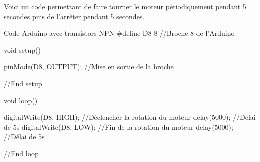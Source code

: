     Voici un code permettant de faire tourner le moteur périodiquement pendant 5 secondes puis de l'arrêter pendant 5 secondes.

\begin{Cpp}{Code Arduino avec transistors NPN}
#define D8 8     //Broche 8 de l'Arduino

void setup() {

  pinMode(D8, OUTPUT); //Mise en sortie de la broche

}//End setup

void loop() {

  digitalWrite(D8, HIGH);     //Déclencher la rotation du moteur
  delay(5000);                //Délai de 5s
  digitalWrite(D8, LOW);      //Fin de la rotation du moteur
  delay(5000);                //Délai de 5s

}//End loop

\end{Cpp}
